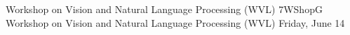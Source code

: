 \begin{wsschedule}
{Workshop on Vision and Natural Language Processing (WVL)}
{7}{WShopG}
{Workshop on Vision and Natural Language Processing (WVL)}
{Friday, June 14}{\WShopLocG}

\end{wsschedule}
